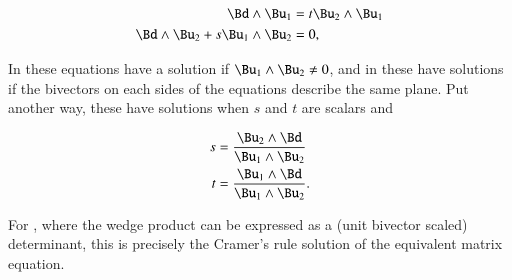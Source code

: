 \begin{dmath}\label{eqn:SimpleProducts2:1080}
\begin{aligned}
\Bd \wedge \Bu_1 &= t \Bu_2 \wedge \Bu_1 \\
\Bd \wedge \Bu_2 + s \Bu_1 \wedge \Bu_2 &= 0,
\end{aligned}
\end{dmath}

In  these equations have a solution if \( \Bu_1 \wedge \Bu_2 \ne 0 \), and in  these have solutions if the bivectors on each sides of the equations describe the same plane.
Put another way, these have solutions when \( s \) and \( t \) are scalars and

\begin{dmath}\label{eqn:SimpleProducts2:1100}
\begin{aligned}
s &= \frac{\Bu_2 \wedge \Bd}{\Bu_1 \wedge \Bu_2} \\
t &= \frac{\Bu_1 \wedge \Bd}{\Bu_1 \wedge \Bu_2}.
\end{aligned}
\end{dmath}

For ,
where the wedge product can be expressed as a (unit bivector scaled) determinant, this is precisely the Cramer's rule solution of the equivalent matrix equation.
